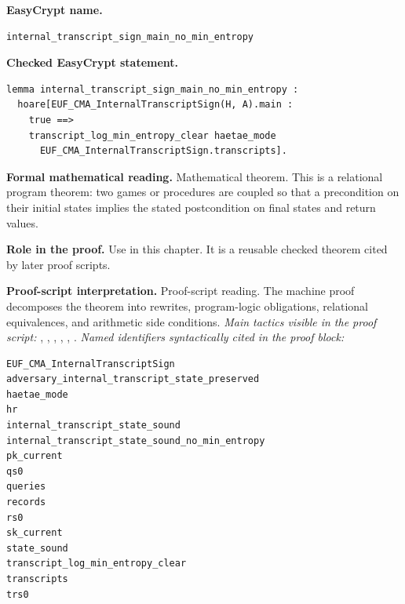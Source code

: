 \begin{formaltheorem}
\noindent\textbf{EasyCrypt name.}
\begin{lstlisting}[language=EasyCrypt,basicstyle=\ttfamily\scriptsize]
internal_transcript_sign_main_no_min_entropy
\end{lstlisting}
\noindent\textbf{Checked EasyCrypt statement.}
\begin{lstlisting}[language=EasyCrypt,basicstyle=\ttfamily\scriptsize]
lemma internal_transcript_sign_main_no_min_entropy :
  hoare[EUF_CMA_InternalTranscriptSign(H, A).main :
    true ==>
    transcript_log_min_entropy_clear haetae_mode
      EUF_CMA_InternalTranscriptSign.transcripts].
\end{lstlisting}
\noindent\textbf{Formal mathematical reading.}
Mathematical theorem. This is a relational program theorem: two games or procedures are coupled so that a precondition on their initial states implies the stated postcondition on final states and return values.

\noindent\textbf{Role in the proof.}
Use in this chapter. It is a reusable checked theorem cited by later proof scripts.

\noindent\textbf{Proof-script interpretation.}
Proof-script reading. The machine proof decomposes the theorem into rewrites, program-logic obligations, relational equivalences, and arithmetic side conditions.
\emph{Main tactics visible in the proof script:} , , , , , .
\emph{Named identifiers syntactically cited in the proof block:}
\begin{lstlisting}[language=EasyCrypt,basicstyle=\ttfamily\scriptsize]
EUF_CMA_InternalTranscriptSign
adversary_internal_transcript_state_preserved
haetae_mode
hr
internal_transcript_state_sound
internal_transcript_state_sound_no_min_entropy
pk_current
qs0
queries
records
rs0
sk_current
state_sound
transcript_log_min_entropy_clear
transcripts
trs0
\end{lstlisting}

\end{formaltheorem}

